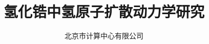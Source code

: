 
\title{氢化锆中氢原子扩散动力学研究}
\author[ ]{北京市计算中心有限公司}   %
\renewcommand*{\Authfont}{\small\rm} %
\renewcommand*{\Affilfont}{\small\it} %
\renewcommand\Authands{ and } %
\renewcommand\Authands{ , } %
\date{} %


